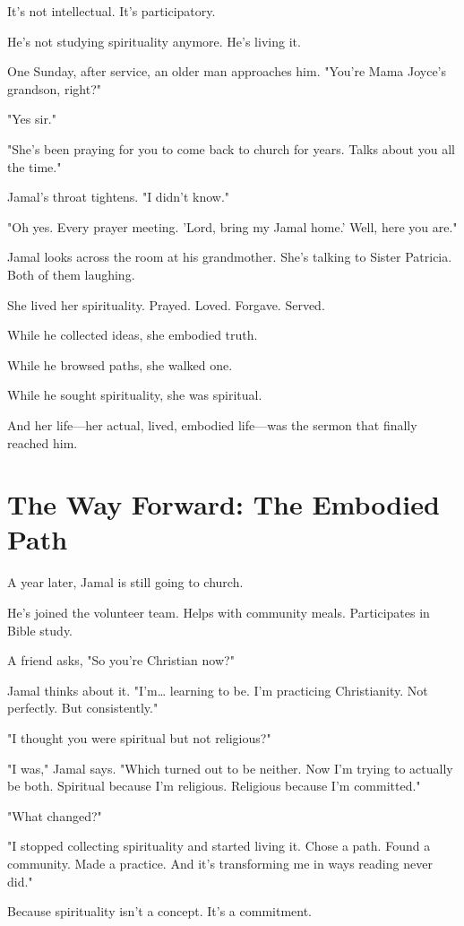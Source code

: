 \documentclass[11pt,twoside]{book}
\begin{document}
It's not intellectual. It's participatory.

He's not studying spirituality anymore. He's living it.

One Sunday, after service, an older man approaches him. "You're Mama Joyce's grandson, right?"

"Yes sir."

"She's been praying for you to come back to church for years. Talks about you all the time."

Jamal's throat tightens. "I didn't know."

"Oh yes. Every prayer meeting. 'Lord, bring my Jamal home.' Well, here you are."

Jamal looks across the room at his grandmother. She's talking to Sister Patricia. Both of them laughing.

She lived her spirituality. Prayed. Loved. Forgave. Served.

While he collected ideas, she embodied truth.

While he browsed paths, she walked one.

While he sought spirituality, she was spiritual.

And her life—her actual, lived, embodied life—was the sermon that finally reached him.

\section*{The Way Forward: The Embodied Path}

A year later, Jamal is still going to church.

He's joined the volunteer team. Helps with community meals. Participates in Bible study.

A friend asks, "So you're Christian now?"

Jamal thinks about it. "I'm\ldots{} learning to be. I'm practicing Christianity. Not perfectly. But consistently."

"I thought you were spiritual but not religious?"

"I was," Jamal says. "Which turned out to be neither. Now I'm trying to actually be both. Spiritual because I'm religious. Religious because I'm committed."

"What changed?"

"I stopped collecting spirituality and started living it. Chose a path. Found a community. Made a practice. And it's transforming me in ways reading never did."

Because spirituality isn't a concept. It's a commitment.
\end{document}
